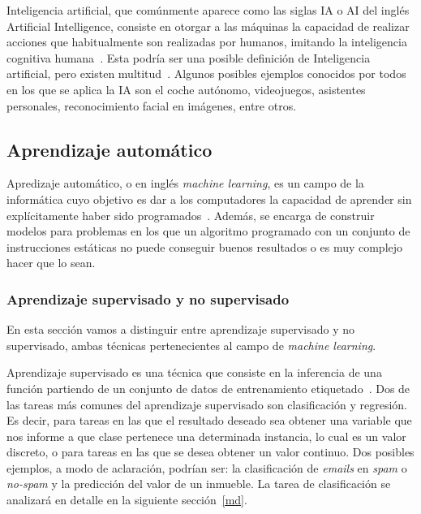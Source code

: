 Inteligencia artificial, que comúnmente aparece como las siglas IA o AI del inglés Artificial Intelligence, consiste en otorgar a las máquinas la capacidad de realizar acciones que habitualmente son realizadas por humanos, imitando la inteligencia cognitiva humana~\cite{alanturing:ai}. Esta podría ser una posible definición de Inteligencia artificial, pero existen multitud~\cite{russell1995modern}. Algunos posibles ejemplos conocidos por todos en los que se aplica la IA son el coche autónomo, videojuegos, asistentes personales, reconocimiento facial en imágenes, entre otros.

\subsection{Aprendizaje automático}

Apredizaje automático, o en inglés \textit{machine learning}, es un campo de la informática cuyo objetivo es dar a los computadores la capacidad de aprender sin explícitamente haber sido programados~\cite{wiki:machinelearning}. Además, se encarga de construir modelos para problemas en los que un algoritmo programado con un conjunto de instrucciones estáticas no puede conseguir buenos resultados o es muy complejo hacer que lo sean.



\subsubsection{Aprendizaje supervisado y no supervisado}

En esta sección vamos a distinguir entre aprendizaje supervisado y no supervisado, ambas técnicas pertenecientes al campo de \textit{machine learning}.

Aprendizaje supervisado es una técnica que consiste en la inferencia de una función partiendo de un conjunto de datos de entrenamiento etiquetado~\cite{wiki:supervisedLearning}. Dos de las tareas más comunes del aprendizaje supervisado son clasificación y regresión. Es decir, para tareas en las que el resultado deseado sea obtener una variable que nos informe a que clase pertenece una determinada instancia, lo cual es un valor discreto, o para tareas en las que se desea obtener un valor continuo. Dos posibles ejemplos, a modo de aclaración,  podrían ser: la clasificación de \textit{emails} en \textit{spam} o \textit{no-spam} y la predicción del valor de un inmueble. La tarea de clasificación se analizará en detalle en la siguiente sección~\ref{md}.

